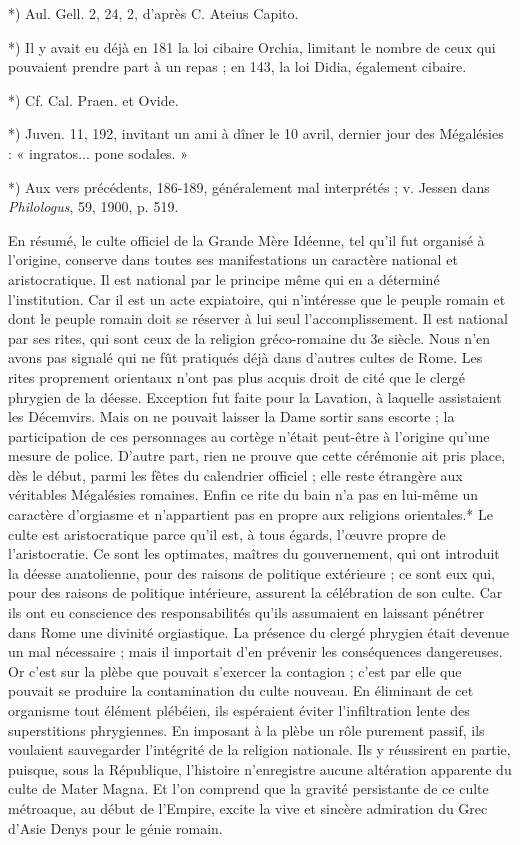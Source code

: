 \documentclass[a4paper, 11pt, oneside, polutonikogreek, french]{article}
\begin{document}
*) Aul. Gell. 2, 24, 2, d'après C. Ateius Capito.

*) Il y avait eu déjà en 181 la loi cibaire Orchia, limitant le nombre de ceux qui pouvaient prendre part à un repas ; en 143, la loi Didia, également cibaire.

*) Cf. Cal. Praen. et Ovide.

*) Juven. 11, 192, invitant un ami à dîner le 10 avril, dernier jour des Mégalésies : « ingratos... pone sodales. »

*) Aux vers précédents, 186-189, généralement mal interprétés ; v. Jessen dans \emph{Philologus}, 59, 1900, p. 519.

En résumé, le culte officiel de la Grande Mère Idéenne, tel qu'il fut organisé à l'origine, conserve dans toutes ses manifestations un caractère national et aristocratique. Il est national par le principe même qui en a déterminé l'institution. Car il est un acte expiatoire, qui n'intéresse que le peuple romain et dont le peuple romain doit se réserver à lui seul l'accomplissement. Il est national par ses rites, qui sont ceux de la religion gréco-romaine du 3e siècle. Nous n'en avons pas signalé qui ne fût pratiqués déjà dans d'autres cultes de Rome. Les rites proprement orientaux n'ont pas plus acquis droit de cité que le clergé phrygien de la déesse. Exception fut faite pour la Lavation, à laquelle assistaient les Décemvirs. Mais on ne pouvait laisser la Dame sortir sans escorte ; la participation de ces personnages au cortège n'était peut-être à l'origine qu'une mesure de police. D'autre part, rien ne prouve que cette cérémonie ait pris place, dès le début, parmi les fêtes du calendrier officiel ; elle reste étrangère aux véritables Mégalésies romaines. Enfin ce rite du bain n'a pas en lui-même un caractère d'orgiasme et n'appartient pas en propre aux religions orientales.* Le culte est aristocratique parce qu'il est, à tous égards, l'œuvre propre de l'aristocratie. Ce sont les optimates, maîtres du gouvernement, qui ont introduit la déesse anatolienne, pour des raisons de politique extérieure ; ce sont eux qui, pour des raisons de politique intérieure, assurent la célébration de son culte. Car ils ont eu conscience des responsabilités qu'ils assumaient en laissant pénétrer dans Rome une divinité orgiastique. La présence du clergé phrygien était devenue un mal nécessaire ; mais il importait d'en prévenir les conséquences dangereuses. Or c'est sur la plèbe que pouvait s'exercer la contagion ; c'est par elle que pouvait se produire la contamination du culte nouveau. En éliminant de cet organisme tout élément plébéien, ils espéraient éviter l'infiltration lente des superstitions phrygiennes. En imposant à la plèbe un rôle purement passif, ils voulaient sauvegarder l'intégrité de la religion nationale. Ils y réussirent en partie, puisque, sous la République, l'histoire n'enregistre aucune altération apparente du culte de Mater Magna. Et l'on comprend que la gravité persistante de ce culte métroaque, au début de l'Empire, excite la vive et sincère admiration du Grec d'Asie Denys pour le génie romain.
\end{document}

